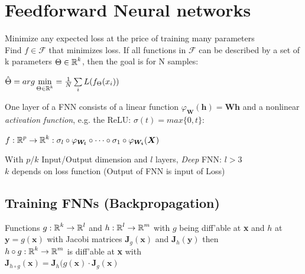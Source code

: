 \documentclass[english]{latex4ei/latex4ei_sheet}
\begin{document}
\section{Feedforward Neural networks}
\begin{sectionbox}
Minimize any expected loss at the price of training many parameters\\
Find $f\in \mathcal{F}$ that minimizes loss. If all functions in $\mathcal{F}$ can be described by a set of k parameters $\Theta\in\operatorname{\mathbb R}^k$, then the goal is for N samples: \\
\begin{center}
    $\hat{\Theta}=arg\min\limits_{\Theta\in\operatorname{\mathbb R}^k}=\frac{1}{N}\sum\limits_iL(f_\Theta(x_i))$
\end{center}
One layer of a FNN consists of a linear function $\varphi_{\boldsymbol{W}}(\boldsymbol{h})=\boldsymbol{Wh}$ and a nonlinear \emph{activation function}, e.g. the ReLU: $\sigma(t) = max\{0, t\}$:
\begin{center}
    $f:\operatorname{\mathbb R}^p \rightarrow \operatorname{\mathbb R}^k: \sigma_l\circ\varphi_{\boldsymbol{W_l}}\circ\cdots\circ\sigma_1\circ\varphi_{\boldsymbol{W_i}}(\boldsymbol{X})$
\end{center}
With $p$/$k$ Input/Output dimension and $l$ layers, \emph{Deep} FNN: $l>3$\\
$k$ depends on loss function (Output of FNN is input of Loss)

\subsection{Training FNNs (Backpropagation)}
\begin{emphbox}
        Functions $g:\operatorname{\mathbb R}^k\rightarrow\operatorname{\mathbb R}^l$ and $h:\operatorname{\mathbb R}^l\rightarrow\operatorname{\mathbb R}^m$ with $g$ being diff'able at \textbf{x} and $h$ at $\boldsymbol{y}=g(\boldsymbol{x})$ with Jacobi matrices $\boldsymbol{J}_g(\boldsymbol{x})$ and $\boldsymbol{J}_h(\boldsymbol{y})$ then\\
        $h\circ g:\operatorname{\mathbb R}^k\rightarrow\operatorname{\mathbb R}^m$ is diff'able at \textbf{x} with\\
        $\boldsymbol{J}_{h\circ g}(\boldsymbol{x})=\boldsymbol{J}_h(g(\boldsymbol{x})\cdot \boldsymbol{J}_g(\boldsymbol{x})$
\end{emphbox}
\end{sectionbox}
\end{document}
